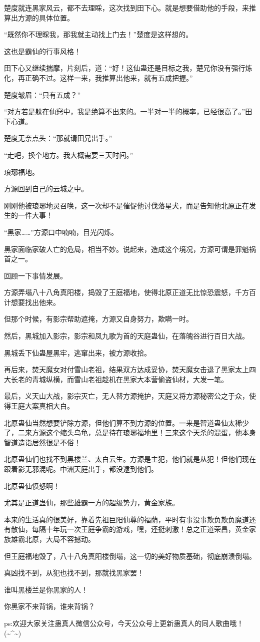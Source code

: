 \begin{this_body}
楚度就连黑家风云，都不去理睬，这次找到田下心。就是想要借助他的手段，来推算出方源的具体位置。

“既然你不理睬我，那我就主动找上门去！”楚度是这样想的。

这也是霸仙的行事风格！

田下心又继续揣摩，片刻后，道：“好！这仙蛊还是目标之我，楚兄你没有强行炼化，再正确不过。这样一来，我推算出他来，就有五成把握。”

楚度皱眉：“只有五成？”

“对方若是躲在仙窍中，我是绝算不出来的。一半对一半的概率，已经很高了。”田下心道。

楚度无奈点头：“那就请田兄出手。”

“走吧，换个地方。我大概需要三天时间。”

琅琊福地。

方源回到自己的云城之中。

刚刚他被琅琊地灵召唤，这一次却不是催促他讨伐落星犬，而是告知他北原正在发生的一件大事！

“黑家……”方源口中喃喃，目光闪烁。

黑家面临家破人亡的危局，相当不妙。说起来，造成这个境况，方源可谓是罪魁祸首之一。

回顾一下事情发展。

方源弄塌八十八角真阳楼，捣毁了王庭福地，使得北原正道无比惊恐震怒，千方百计想要找出他来。

但那个时候，有影宗帮助遮掩，方源又自身努力，欺瞒一时。

然后，黑城加入影宗，影宗和凤九歌为首的天庭蛊仙，在落魄谷进行百日大战。

黑城丢下仙蛊屋黑牢，逃窜出来，被方源收拾。

再后来，焚天魔女对付雪山老祖，结果双方达成妥协，焚天魔女击退了黑家太上四大长老的青城纵横，而雪山老祖趁机在黑家大本营偷盗仙材，大发一笔。

最后，义天山大战，影宗灭亡，无人替方源掩护，天庭又将方源秘密公之于众，使得王庭大案真相大白。

北原蛊仙当然想要铲除方源，但他们算不到方源的位置。一来是智道蛊仙太稀少了，二来方源这个缩头乌龟，总是待在琅琊福地里！三来这个天杀的混蛋，他本身智道造诣居然很是不俗！

北原蛊仙们也找不到黑楼兰、太白云生。方源是主犯，他们就是从犯！但他们现在跟着影无邪混呢。中洲天庭出手，都没逮到他们。

北原蛊仙愤怒啊！

尤其是正道蛊仙，那些雄霸一方的超级势力，黄金家族。

本来的生活真的很美好，靠着先祖巨阳仙尊的福荫，平时有事没事欺负欺负魔道还有散仙，每隔十年玩一次王庭争霸的游戏，嘿，还挺刺激！总之正道荣昌，黄金家族雄霸北原，大局不容撼动。

但王庭福地毁了，八十八角真阳楼倒塌，这一切的美好物质基础，彻底崩溃倒塌。

真凶找不到，从犯也找不到，那就找黑家罢！

谁叫黑楼兰是你黑家的人！

你黑家不来背锅，谁来背锅？

ps:欢迎大家关注蛊真人微信公众号，今天公众号上更新蛊真人的同人歌曲哦！(\~{}\^{}\~{})

\end{this_body}

